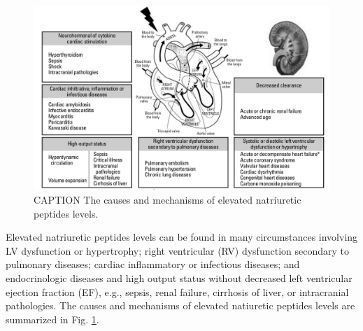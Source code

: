 \documentclass[14pt,a4paper,onecolumn]{extarticle}
\begin{document}


\begin{figure}      \centering      \includegraphics[scale=0.3]{../../images/NP_causes.png}      \small\caption{CAPTION The causes and mechanisms of elevated natriuretic peptides levels.}      \label{NP_causes}  \end{figure} %

Elevated natriuretic peptides levels can be found in many circumstances involving LV dysfunction or hypertrophy; right ventricular (RV) dysfunction secondary to pulmonary diseases; cardiac inflammatory or infectious diseases; and endocrinologic diseases and high output status without decreased left ventricular ejection fraction (EF), e.g., sepsis, renal failure, cirrhosis of liver, or intracranial pathologies. The causes and mechanisms of elevated natiuretic peptides levels are summarized in Fig. \ref{NP_causes}. %
\end{document}
